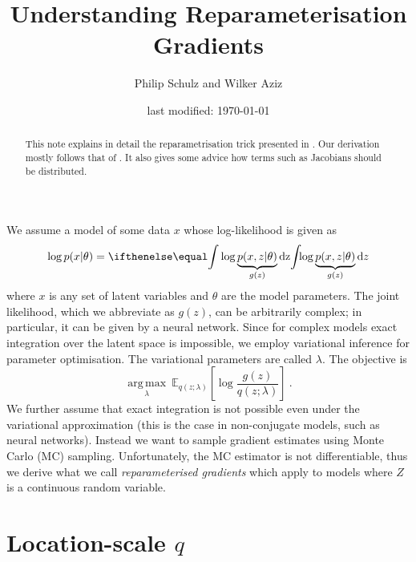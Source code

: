 \documentclass[a4paper,11pt]{article}
\author{Philip Schulz and Wilker Aziz}
\title{Understanding Reparameterisation Gradients}
\date{last modified: \today}
\DeclareMathOperator*{\argmax}{arg\,max}
\begin{document}
\maketitle

\begin{abstract}
This note explains in detail the reparametrisation trick presented in \citep{KingmaWelling:2013,RezendeEtAl:2014,TitsiasLazarogredilla:2014}. 
Our derivation mostly follows that of \citet{TitsiasLazarogredilla:2014}. It also gives some advice how terms such as Jacobians should be distributed.
\end{abstract}


We assume a model of some data $ x $ whose log-likelihood is given as
\begin{equation}
\log p(x|\theta) = \intl { \log \underbrace{p(x,z|\theta)}_{g(z)} } {z} 
\end{equation}
where $ x $ is any set of latent variables and $ \theta $ are the model parameters. The joint likelihood, which we abbreviate as $ g(z) $, can be arbitrarily
complex; in particular, it can be given by a neural network. Since for complex models exact integration over the latent space is impossible, we employ variational
inference for parameter optimisation. The variational parameters are called $ \lambda $. The objective is
\begin{equation} \label{eq:objective}
\underset{\lambda}{\argmax} ~ \mathbb E_{q(z; \lambda)}\left[ \log \frac{g(z)}{q(z; \lambda)} \right] \ .
\end{equation}
We further assume that exact integration is not possible even under the variational approximation (this is the case in non-conjugate models, such as neural networks). Instead we want to sample gradient estimates using Monte Carlo (MC) sampling. Unfortunately, the MC estimator is not differentiable, thus we derive what we call \emph{reparameterised gradients} which apply to models where $Z$ is a continuous random variable.

\section{Location-scale $q$}
 
\end{document}
